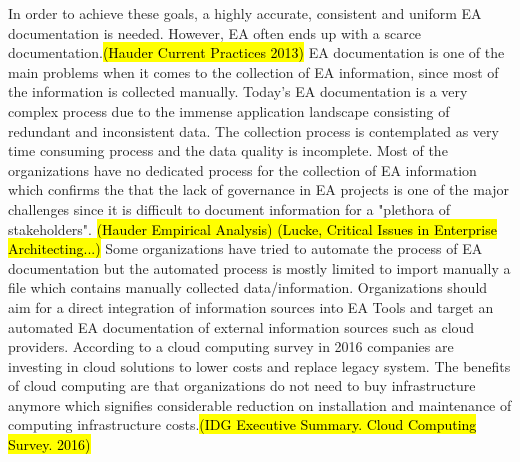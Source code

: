 In order to achieve these goals, a highly accurate, consistent and uniform EA documentation is needed. However, EA often ends up with a scarce documentation.\hl{(Hauder Current Practices 2013)} EA documentation is one of the main problems when it comes to the collection of EA information, since most of the information is collected manually. Today's EA documentation is a very complex process due to the immense application landscape consisting of redundant and inconsistent data. The collection process is contemplated as very time consuming  process and the data quality is incomplete. Most of the organizations have no dedicated process for the collection of EA information which confirms the that the lack of governance in EA projects is one of the major challenges since it is difficult to document information for a "plethora of stakeholders". \hl{(Hauder Empirical Analysis) (Lucke, Critical Issues in Enterprise Architecting...) } Some organizations have tried to automate the process of EA documentation but the automated process is mostly limited to import manually a file which contains manually collected data/information. 
Organizations should aim for a direct integration of information sources into EA Tools and target an automated EA documentation of external information sources such as cloud providers. 
According to a cloud computing survey in 2016 companies are investing in cloud solutions to lower costs and replace legacy system. The benefits of cloud computing are that organizations do not need to buy infrastructure anymore which signifies considerable reduction on installation and maintenance of computing infrastructure costs.\hl{(IDG Executive Summary. Cloud Computing Survey. 2016)}

